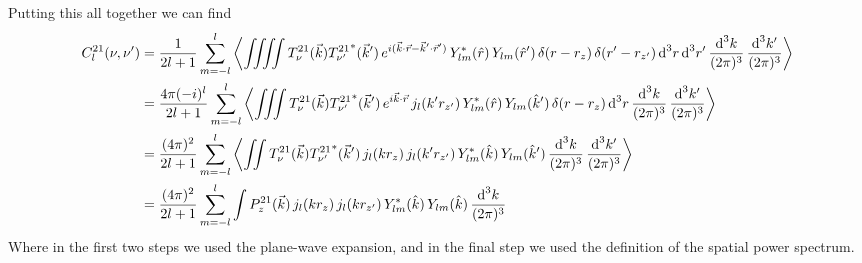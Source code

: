 \begin{bibunit}
\begin{subappendices}
Putting this all together we can find
\begin{align*}
    C^{21}_l(\nu, \nu^\prime) &=
        \frac{1}{2l+1}\sum_{m=-l}^l
        \left\langle
            \iiiint
            T_\nu^{21}(\vec k) {T_{\nu^\prime}^{21}}^*(\vec k^\prime) \,
            e^{i(\vec k\cdot\vec r - \vec k^\prime\cdot\vec r^\prime)} \,
            Y_{lm}^*(\hat r) \,
            Y_{lm}(\hat r^\prime) \,
            \delta(r - r_z) \,
            \delta(r^\prime - r_{z^\prime}) \,
            {\textrm d}^3r \,
            {\textrm d}^3r^\prime \,
            \frac{{\textrm d}^3k}{(2\pi)^3} \,
            \frac{{\textrm d}^3k^\prime}{(2\pi)^3}
        \right\rangle \\
    &=
        \frac{4\pi(-i)^l}{2l+1}\sum_{m=-l}^l
        \left\langle
            \iiint
            T_\nu^{21}(\vec k) {T_{\nu^\prime}^{21}}^*(\vec k^\prime) \,
            e^{i\vec k\cdot\vec r} \,
            j_l(k^\prime r_{z^\prime}) \,
            Y_{lm}^*(\hat r) \,
            Y_{lm}(\hat k^\prime) \,
            \delta(r - r_z) \,
            {\textrm d}^3r \,
            \frac{{\textrm d}^3k}{(2\pi)^3} \,
            \frac{{\textrm d}^3k^\prime}{(2\pi)^3}
        \right\rangle \\
    &=
        \frac{(4\pi)^2}{2l+1}\sum_{m=-l}^l
        \left\langle
            \iint
            T_\nu^{21}(\vec k) {T_{\nu^\prime}^{21}}^*(\vec k^\prime) \,
            j_l(k r_z) \,
            j_l(k^\prime r_{z^\prime}) \,
            Y_{lm}^*(\hat k) \,
            Y_{lm}(\hat k^\prime) \,
            \frac{{\textrm d}^3k}{(2\pi)^3} \,
            \frac{{\textrm d}^3k^\prime}{(2\pi)^3}
        \right\rangle \\
    &=
        \frac{(4\pi)^2}{2l+1}\sum_{m=-l}^l
        \int
        P_z^{21}(\vec k) \,
        j_l(k r_z) \,
        j_l(k r_{z^\prime}) \,
        Y_{lm}^*(\hat k) \,
        Y_{lm}(\hat k) \,
        \frac{{\textrm d}^3k}{(2\pi)^3} \\
\end{align*}
Where in the first two steps we used the plane-wave expansion, and in the final step we used the
definition of the spatial power spectrum.


\end{subappendices}
\end{bibunit}
